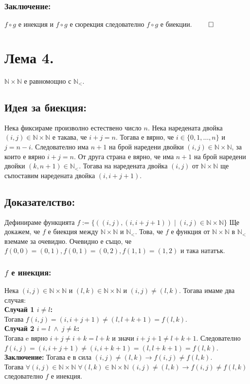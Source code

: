 \documentclass[a4paper, 12pt, oneside]{article}
\newcommand{\N}{\mathbb{N}}
\newcommand{\LN}{\N_<}
\begin{document}
\subsubsection*{Заключение:}
\(f \circ g\) е инекция и \(f \circ g\) е сюрекция следователно \(f \circ g\) е биекции. \(\qed\)
\section*{Лема 4.}
\(\N\times\N\) е равномощно с \(\LN\).
\subsection*{Идея за биекция:}
Нека фиксираме произволно естествено число \(n\).
Нека наредената двойка \((i, j) \in \N\times\N\) е такава, че \(i + j = n\).
Тогава е вярно, че \(i \in \{0, 1, \dots, n\}\) и \(j = n - i\).
Следователно има \(n + 1\) на брой наредени двойки \((i, j) \in \N\times\N\),
за които е вярно \(i + j = n\). От друга страна е вярно, че
има \(n + 1\) на брой наредени двойки \((k, n + 1) \in \LN\).
Тогава на наредената двойка \((i, j)\) от \(\N\times\N\) ще съпоставим наредената двойка \((i, i + j + 1)\).
\subsection*{Доказателство:}
Дефинираме функцията \(f := \{((i, j), (i, i + j + 1)) \; | \; (i, j) \in \N\times\N\}\)
Ще докажем, че \(f\) е биекция между \(\N\times\N\) и \(\LN\). Това, че \(f\) е функция от \(\N\times\N\) в \(\LN\) вземаме за очевидно.
Очевидно е също, че \(f(0, 0) = (0, 1), f(0, 1) = (0, 2), f(1, 1) = (1, 2)\) и така нататък.
\subsubsection*{\(f\) е инекция:}
Нека \((i, j) \in \N\times\N\) и \((l, k) \in \N\times\N\) и \((i, j) \neq (l, k)\).
Тогава имаме два случая: \\
\textbf{Случай 1 \(i \neq l\):} \\
Тогава \(f(i, j) = (i, i + j + 1) \neq (l, l + k + 1) = f(l, k)\). \\
\textbf{Случай 2 \(i = l \; \land \; j \neq k\):} \\
Тогава e вярно \(i + j \neq i + k = l + k\) и значи \(i + j + 1 \neq l + k + 1\).
Следователно \(f(i, j) = (i, i + j + 1) \neq (i, i + k + 1) = (l, l + k + 1) = f(l, k)\). \\
\textbf{Заключение:}
Тогава е в сила \((i, j) \neq (l, k) \longrightarrow f(i, j) \neq f(l, k)\). \\
Тогава \(\forall (i, j) \in \N\times\N \; \forall (l, k) \in \N\times\N \; (i, j) \neq (l, k) \longrightarrow f(i, j) \neq f(l, k)\) \\
следователно \(f\) е инекция.
\end{document}
